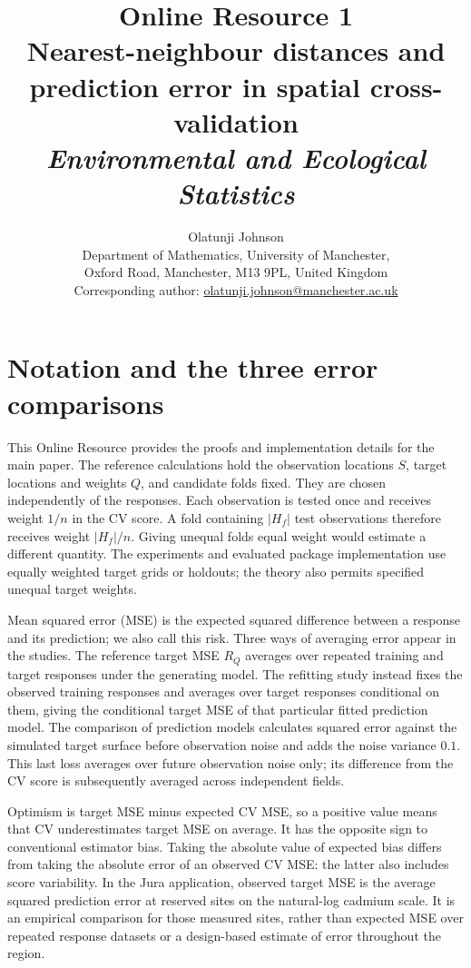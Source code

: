 \documentclass[11pt,a4paper]{article}
\title{Online Resource 1\\[0.5ex]\large Nearest-neighbour distances and prediction error in spatial cross-validation\\[0.5ex]\normalsize\emph{Environmental and Ecological Statistics}}
\author{Olatunji Johnson\\Department of Mathematics, University of Manchester,\\Oxford Road, Manchester, M13 9PL, United Kingdom\\Corresponding author: \href{mailto:olatunji.johnson@manchester.ac.uk}{olatunji.johnson@manchester.ac.uk}}
\date{}
\begin{document}
\maketitle
\tableofcontents
\section{Notation and the three error comparisons}
\label{sec:notation}
This Online Resource provides the proofs and implementation details for the main paper. The reference calculations hold the observation locations $S$, target locations and weights $Q$, and candidate folds fixed. They are chosen independently of the responses. Each observation is tested once and receives weight $1/n$ in the CV score. A fold containing $|H_f|$ test observations therefore receives weight $|H_f|/n$. Giving unequal folds equal weight would estimate a different quantity. The experiments and evaluated package implementation use equally weighted target grids or holdouts; the theory also permits specified unequal target weights.

Mean squared error (MSE) is the expected squared difference between a response and its prediction; we also call this risk. Three ways of averaging error appear in the studies. The reference target MSE $R_Q$ averages over repeated training and target responses under the generating model. The refitting study instead fixes the observed training responses and averages over target responses conditional on them, giving the conditional target MSE of that particular fitted prediction model. The comparison of prediction models calculates squared error against the simulated target surface before observation noise and adds the noise variance $0.1$. This last loss averages over future observation noise only; its difference from the CV score is subsequently averaged across independent fields.

Optimism is target MSE minus expected CV MSE, so a positive value means that CV underestimates target MSE on average. It has the opposite sign to conventional estimator bias. Taking the absolute value of expected bias differs from taking the absolute error of an observed CV MSE: the latter also includes score variability. In the Jura application, observed target MSE is the average squared prediction error at reserved sites on the natural-log cadmium scale. It is an empirical comparison for those measured sites, rather than expected MSE over repeated response datasets or a design-based estimate of error throughout the region.
\end{document}
